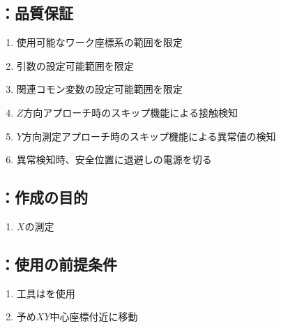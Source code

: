 \subsection{\MYOThickness：品質保証}
\begin{enumerate}[label*=\sarrow]
\item 使用可能なワーク座標系の範囲を限定
\item {}引数の設定可能範囲を限定
\item 関連コモン変数の設定可能範囲を限定
\item $Z$方向アプローチ時のスキップ機能による接触検知
\item $Y$方向測定アプローチ時のスキップ機能による異常値の検知
\item 異常検知時、安全位置に退避し\TouchSensorProbe の電源を切る
\end{enumerate}



\clearpage


\subsection{\MXOface：作成の目的}
\begin{enumerate}[label*=\sarrow]
\item \KeywayCenter$X$の測定
\end{enumerate}


\subsection{\MXOface：使用の前提条件}
\begin{enumerate}[label*=\sarrow]
\item 工具は\TouchSensorProbe を使用
\item 予め\KeywayCenter $XY$中心座標付近に移動
\end{enumerate}



